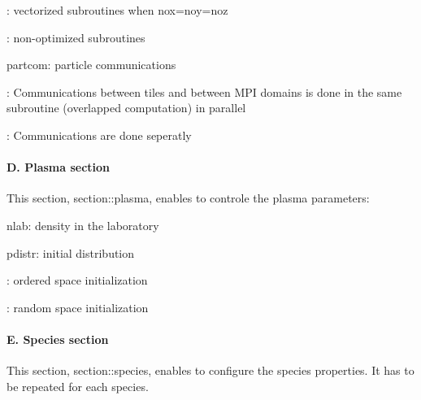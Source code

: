 \begin{DoxyItemize}
\begin{DoxyItemize}
\item {}\+: vectorized subroutines when {\ttfamily nox=noy=noz}
\item {}\+: non-\/optimized subroutines
\end{DoxyItemize}
\item {\ttfamily partcom}\+: particle communications
\begin{DoxyItemize}
\item {}\+: Communications between tiles and between M\+PI domains is done in the same subroutine (overlapped computation) in parallel
\item {}\+: Communications are done seperatly
\end{DoxyItemize}
\end{DoxyItemize}

\paragraph*{D. Plasma section}

This section, {\ttfamily section\+::plasma}, enables to controle the plasma parameters\+:


\begin{DoxyItemize}
\item {\ttfamily nlab}\+: density in the laboratory
\item {\ttfamily pdistr}\+: initial distribution
\begin{DoxyItemize}
\item {}\+: ordered space initialization
\item {}\+: random space initialization
\end{DoxyItemize}
\end{DoxyItemize}

\paragraph*{E. Species section}

This section, {\ttfamily section\+::species}, enables to configure the species properties. It has to be repeated for each species.


